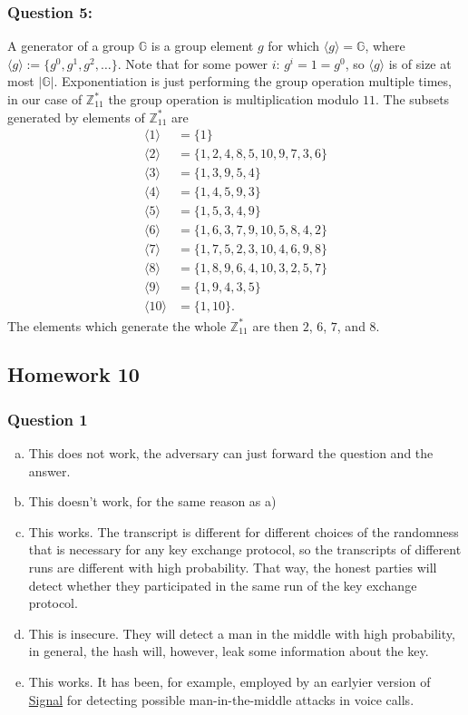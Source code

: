 \documentclass{article}
\numberwithin{defn}{section}
\numberwithin{equation}{section}
\begin{document}
\subsubsection*{Question 5:}
A generator of a group $\mathbb{G}$ is a group element $g$ for which $\langle g\rangle=\mathbb{G}$, where $\langle g \rangle:=\{ g^0,g^1,g^2,\dots  \}$. Note that for some power $i$: $g^i=1=g^0$, so $\langle g \rangle$ is of size at most $|\mathbb{G}|$. Exponentiation is just performing the group operation multiple times, in our case of $\mathbb{Z}_{11}^*$ the group operation is multiplication modulo $11$. The subsets generated by elements of $\mathbb{Z}_{11}^*$ are
\begin{align*}
\langle 1 \rangle &= \{1\}\\
\langle 2 \rangle &= \{1, 2, 4, 8, 5, 10, 9, 7, 3, 6\}\\
\langle 3 \rangle &= \{1, 3, 9, 5, 4\}\\
\langle 4 \rangle &= \{1, 4, 5, 9, 3\}\\
\langle 5 \rangle &= \{1, 5, 3, 4, 9\}\\
\langle 6 \rangle &= \{1, 6, 3, 7, 9, 10, 5, 8, 4, 2\}\\
\langle 7 \rangle &= \{1, 7, 5, 2, 3, 10, 4, 6, 9, 8\}\\
\langle 8 \rangle &= \{1, 8, 9, 6, 4, 10, 3, 2, 5, 7\}\\
\langle 9 \rangle &= \{1, 9, 4, 3, 5\}\\
\langle 10 \rangle &= \{1, 10\}.
\end{align*}
The elements which generate the whole $\mathbb{Z}_{11}^*$ are then $2$, $6$, $7$, and $8$.
	
	
	
\subsection*{Homework 10}

	\subsubsection*{Question 1}
	\begin{enumerate}[a)]
		\item This does not work, the adversary can just forward the question and the answer.
		\item This doesn't work, for the same reason as a)
		\item This works. The transcript is different for different choices of the randomness that is necessary for any key exchange protocol, so the transcripts of different runs are different with high probability. That way, the honest parties will detect whether they participated in the same run of the key exchange protocol.
		\item This is insecure. They will detect a man in the middle with high probability, in general, the hash will, however, leak some information about the key.
		\item This works. It has been, for example, employed by an earlyier version of \href{https://signal.org/}{Signal} for detecting possible man-in-the-middle attacks in voice calls.
	\end{enumerate}
\end{document}
